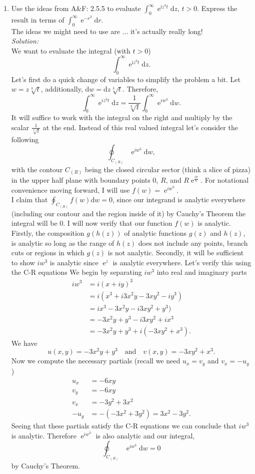 \documentclass[10pt]{amsart}
\newcommand{\D}{\mathrm{d}}
\newcommand{\I}{\mathrm{i}}
\DeclareMathOperator{\E}{e}
\theoremstyle{nonumberplain}
\begin{document}
\begin{enumerate}[label={\bf {\arabic*}:}]
\item Use the ideas from A\&F: 2.5.5 to evaluate $\int_0^\infty \E^{\I
    z^3 t} \D z$, $t > 0$.  Express the result in terms of $\int_0^\infty \E^{-
    r^3} \D r$. \\
The ideas we might need to use are ... it's actually really long! \\
\textit{Solution:}\\
We want to evaluate the integral (with $t > 0$)
$$\int_0^\infty \E^{\I z^3 t} \D z.$$
Let's first do a quick change of variables to simplify the problem a bit.
Let $w = z \sqrt[3]{t}$, additionally, $\D w = \D z \sqrt[3]{t}$.
Therefore,
$$
\int_{0}^{\infty} \E^{iz^3t} \D z = \frac{1} {\sqrt[3]{t}} \int_{0}^{\infty} \E^{iw^3} \D w.
$$
It will suffice to work with the integral on the right and multiply by the scalar $\frac 1 {\sqrt[3] t}$ at the end.
Instead of this real valued integral let's consider the following
$$
\oint_{C_{(R)}} \E^{iw^3} \D w,
$$
with the contour $C_{(R)}$ being the closed circular sector (think a slice of pizza) in the upper half plane with boundary points $0$, $R$, and $R\E^{\frac{i\pi}{6}}$.
For notational convenience moving forward, I will use $f(w) = \E^{iw^3}$.
\\

\noindent
I claim that $\oint_{C_{(R)}} f(w) \D w = 0$, since our integrand is analytic everywhere (including our contour and the region inside of it) by Cauchy's Theorem the integral will be 0.
I will now verify that our function $f(w)$ is analytic.
Firstly, the composition $g(h(z))$ of analytic functions $g(z)$ and $h(z)$, is analytic so long as the range of $h(z)$ does not include any points, branch cuts or regions in which $g(z)$ is not analytic.
Secondly, it will be sufficient to show $iw^3$ is analytic since $\E^z$ is analytic everywhere.
Let's verify this using the C-R equations
We begin by separating $iw^3$ into real and imaginary parts
\begin{align*}
iw^3 &= i (x + iy)^3 \\
	&= i(x^3 + i3x^2y - 3xy^2 -iy^3) \\
	&= ix^3 - 3x^2y - i3xy^2 + y^3) \\
	&=  - 3x^2y  + y^3 - i3xy^2 + ix^3 \\
	&=  - 3x^2y  + y^3 + i\left(-3xy^2 + x^3\right).
\end{align*}
We have $$u(x, y) = - 3x^2y  + y^3 \quad \text{and} \quad v(x, y) = -3xy^2 + x^3.$$
Now we compute the necessary partials (recall we need $u_x = v_y$ and $v_x = - u_y$)
\begin{align*}
u_x &= -6xy \\
v_y &= -6xy \\
v_x &= -3y^2 + 3x^2 \\
-u_y &= -\left( -3x^2 + 3y^2 \right) = 3x^2 - 3y^2.
\end{align*}
Seeing that these partials satisfy the C-R equations we can conclude that $iw^3$ is analytic.
Therefore $\E^{iw^3}$ is also analytic and our integral, $$\oint_{C_{(R)}} \E^{iw^3} \D w = 0$$ by Cauchy's Theorem. \\


\end{enumerate}
\end{document}
